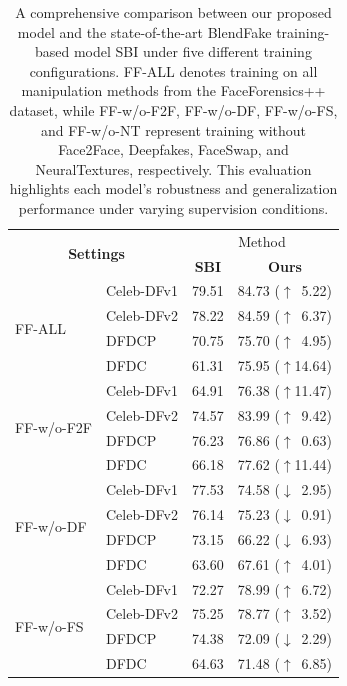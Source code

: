 \documentclass[final,5p,times]{elsarticle}
\begin{document}
\begin{table}[htb]\rmfamily
    \centering
    \caption{A comprehensive comparison between our proposed model and the state-of-the-art BlendFake training-based model SBI \cite{18} under five different training configurations. FF-ALL denotes training on all manipulation methods from the FaceForensics++ dataset, while FF-w/o-F2F, FF-w/o-DF, FF-w/o-FS, and FF-w/o-NT represent training without Face2Face, Deepfakes, FaceSwap, and NeuralTextures, respectively. This evaluation highlights each model's robustness and generalization performance under varying supervision conditions.}
    \label{tab5}
    \begin{tabular}{llcc}
        \toprule
        \multicolumn{2}{c}{\multirow{2}{*}{\textbf{Settings}}} & \multicolumn{2}{c}{Method}\\
 \cmidrule(lr){3-4}& & \textbf{SBI}&\textbf{Ours} \\
        \cmidrule(lr){1-2} \cmidrule(lr){3-4}
        
        \multirow{4}{*}{FF-ALL} 
        & Celeb-DFv1  & 79.51 & 84.73 ($\uparrow \,$ 5.22) \\
        & Celeb-DFv2  & 78.22 & 84.59 ($\uparrow \,$ 6.37) \\
        & DFDCP       & 70.75 & 75.70 ($\uparrow \,$ 4.95) \\
        & DFDC        & 61.31 & 75.95 ($\uparrow$14.64) \\
        \cmidrule(lr){2-4}

        \multirow{4}{*}{FF-w/o-F2F} 
        & Celeb-DFv1  & 64.91 & 76.38 ($\uparrow$11.47) \\
        & Celeb-DFv2  & 74.57 & 83.99 ($\uparrow \,$ 9.42) \\
        & DFDCP       & 76.23 & 76.86 ($\uparrow \,$ 0.63) \\
        & DFDC        & 66.18 & 77.62 ($\uparrow$11.44) \\
        \cmidrule(lr){2-4}

        \multirow{4}{*}{FF-w/o-DF} 
        & Celeb-DFv1  & 77.53 & 74.58 ($\downarrow \,$ 2.95) \\
        & Celeb-DFv2  & 76.14 & 75.23 ($\downarrow \,$ 0.91) \\
        & DFDCP       & 73.15 & 66.22 ($\downarrow \,$ 6.93) \\
        & DFDC        & 63.60 & 67.61 ($\uparrow \,$ 4.01) \\
        \cmidrule(lr){2-4}

        \multirow{4}{*}{FF-w/o-FS} 
        & Celeb-DFv1  & 72.27 & 78.99 ($\uparrow \,$ 6.72) \\
        & Celeb-DFv2  & 75.25 & 78.77 ($\uparrow \,$ 3.52) \\
        & DFDCP       & 74.38 & 72.09 ($\downarrow \,$ 2.29) \\
        & DFDC        & 64.63 & 71.48 ($\uparrow \,$ 6.85) \\
        \cmidrule(lr){2-4}


\end{tabular}
\end{table}
\end{document}
